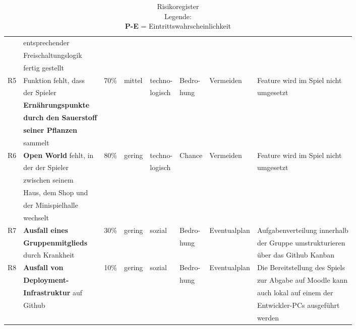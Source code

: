 \begin{table}[H]
\begin{tabular}{|c|l|l|l|l|l|l|l|}
        & entsprechender &  &  &  &&  &  \\
        & Freischaltungslogik &  &  &&  &  &  \\
        & fertig gestellt &  &  &  & & &  \\
        \hline
        R5 & Funktion fehlt, dass & 70\% & mittel & techno- & Bedro- & Vermeiden & Feature wird im Spiel nicht \\
        & der Spieler &  &  & logisch &hung  &  &umgesetzt \\
        & \textbf{Ernährungspunkte} &&  &  &  &  &  \\
        & \textbf{durch den Sauerstoff} &&  &  &  &  &  \\
        & \textbf{seiner Pflanzen} &  &  &&  &  &  \\
        & sammelt &  &  &  &  &  &\\
        \hline
        R6 & \textbf{Open World} fehlt, in & 80\% & gering & techno- & Chance & Vermeiden &  Feature wird im Spiel nicht \\
        & der der Spieler &  &  & logisch& &  & umgesetzt \\
        & zwischen seinem &  &  &  &&  &  \\
        & Haus, dem Shop und &  &  &&  &  &  \\
        & der Minispielhalle &  &  & & &  &  \\
        & wechselt &  &  &  &  & & \\
        \hline
        R7 & \textbf{Ausfall eines} & 30\% & gering & sozial & Bedro- & Eventualplan & Aufgabenverteilung innerhalb \\
        & \textbf{Gruppenmitglieds} & & &  & hung &  & der Gruppe umstrukturieren \\
        & durch Krankheit &  &  &  & & & über das Github Kanban \\
        \hline
        R8 & \textbf{Ausfall von} & 10\% & gering & sozial & Bedro- & Eventualplan & Die Bereitstellung des Spiels \\
        & \textbf{Deployment-} &  &  && hung &  & zur Abgabe auf Moodle kann \\
        & \textbf{Infrastruktur} auf & & &  &  &  & auch lokal auf einem der \\
        & Github &  &  &  & & & Entwickler-PCs ausgeführt \\
        &  &  &  &  & & & werden \\
        \hline
    \end{tabular}
    \caption{Risikoregister \\ Legende: \\ \textbf{P-E} = Eintrittswahrscheinlichkeit}
\end{table}